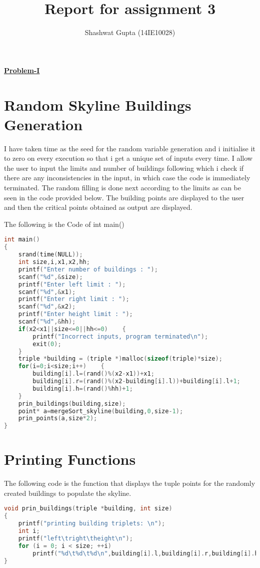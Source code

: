 \documentclass{article}
\title{Report for assignment 3}
\author{Shashwat Gupta (14IE10028)}
\begin{document}
\maketitle

\underline {\textbf{Problem-I}}

\section{Random Skyline Buildings Generation}

I have taken time as the seed for the random variable generation and i initialise it to zero on every execution so that i get a unique set of inputs every time.
I allow the user to input the limits and number of buildings following which i check if there are any inconsistencies in the input, in which case the code is immediately terminated.
The random filling is done next according to the limits as can be seen in the code provided below.
The building points are displayed to the user and then the critical points obtained as output are displayed.

The following is the Code of int main()
\begin{lstlisting}[language=c, caption=main]
int main()
{
    srand(time(NULL)); 
    int size,i,x1,x2,hh;
    printf("Enter number of buildings : ");
    scanf("%d",&size);
    printf("Enter left limit : ");
    scanf("%d",&x1);
    printf("Enter right limit : ");
    scanf("%d",&x2);
    printf("Enter height limit : ");
    scanf("%d",&hh);
    if(x2<x1||size<=0||hh<=0)    {
        printf("Incorrect inputs, program terminated\n");
        exit(0);
    }
    triple *building = (triple *)malloc(sizeof(triple)*size);
    for(i=0;i<size;i++)    {
        building[i].l=(rand()%(x2-x1))+x1;
        building[i].r=(rand()%(x2-building[i].l))+building[i].l+1;
        building[i].h=(rand()%hh)+1;
    }
    prin_buildings(building,size);
    point* a=mergeSort_skyline(building,0,size-1);
    prin_points(a,size*2);
}
\end{lstlisting}

\clearpage

\section{Printing Functions}

The following code is the function that displays the tuple points for the randomly created buildings to populate the skyline.

\begin{lstlisting}[language=c, caption=print buildings]
void prin_buildings(triple *building, int size)
{
    printf("printing building triplets: \n");
    int i;
    printf("left\tright\theight\n");
    for (i = 0; i < size; ++i)
        printf("%d\t%d\t%d\n",building[i].l,building[i].r,building[i].h);
}
\end{lstlisting}
\end{document}
